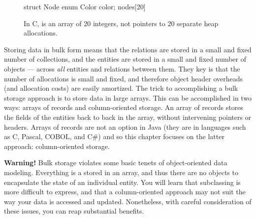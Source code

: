 \begin{figure}
\centering
\vspace{-4mm}
\begin{framedlisting}
struct Node {
  enum Color color;
} nodes[20]
\end{framedlisting}
\caption{In C,  is an array of 20 integers, not
pointers to 20 separate heap allocations.}
\end{figure}
Storing data in bulk form means that the relations are stored in a small and
fixed number of collections, and the entities are stored in a small and fixed
number of objects --- across \emph{all} entities and relations between them.
They key is that the number of allocations is small and fixed, and therefore
object header overheads (and allocation costs) are easily amortized. The trick
to accomplishing a bulk storage approach is to store data in large arrays. This
can be accomplished in two ways: arrays of records and column-oriented storage.
An array of records stores the fields of the entities back to back in the array,
without intervening pointers or headers. Arrays of records are not an option in
Java (they are in languages such as C, Pascal, COBOL, and C\#) and so this
chapter focuses on the latter approach: column-oriented storage.


\textbf{Warning!} Bulk storage violates some basic tenets of object-oriented
data modeling. Everything is a stored in an array, and thus there are no objects
to encapsulate the state of an individual entity. You will learn that
subclassing is more difficult to express, and
that a column-oriented approach may not suit the way your data is accessed and
updated.
Nonetheless, with careful consideration of these issues, you can reap
substantial benefits.






